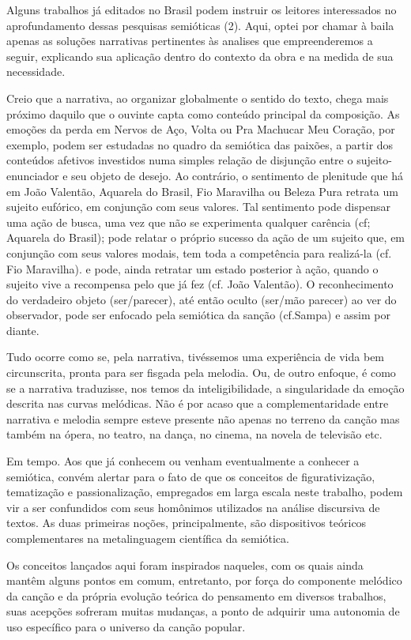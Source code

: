 Alguns trabalhos já editados no Brasil podem instruir os leitores
interessados no aprofundamento dessas pesquisas semióticas (2). Aqui,
optei por chamar à baila apenas as soluções narrativas pertinentes às
analises que empreenderemos a seguir, explicando sua aplicação dentro do
contexto da obra e na medida de sua necessidade.

Creio que a narrativa, ao organizar globalmente o sentido do texto,
chega mais próximo daquilo que o ouvinte capta como conteúdo principal
da composição. As emoções da perda em Nervos de Aço, Volta ou Pra
Machucar Meu Coração, por exemplo, podem ser estudadas no quadro da
semiótica das paixões, a partir dos conteúdos afetivos investidos numa
simples relação de disjunção entre o sujeito-enunciador e seu objeto de
desejo. Ao contrário, o sentimento de plenitude que há em João Valentão,
Aquarela do Brasil, Fio Maravilha ou Beleza Pura retrata um sujeito
eufórico, em conjunção com seus valores. Tal sentimento pode dispensar
uma ação de busca, uma vez que não se experimenta qualquer carência (cf;
Aquarela do Brasil); pode relatar o próprio sucesso da ação de um
sujeito que, em conjunção com seus valores modais, tem toda a
competência para realizá-la (cf. Fio Maravilha). e pode, ainda retratar
um estado posterior à ação, quando o sujeito vive a recompensa pelo que
já fez (cf. João Valentão). O reconhecimento do verdadeiro objeto
(ser/parecer), até então oculto (ser/mão parecer) ao ver do observador,
pode ser enfocado pela semiótica da sanção (cf.Sampa) e assim por
diante.

Tudo ocorre como se, pela narrativa, tivéssemos uma experiência de vida
bem circunscrita, pronta para ser fisgada pela melodia. Ou, de outro
enfoque, é como se a narrativa traduzisse, nos temos da
inteligibilidade, a singularidade da emoção descrita nas curvas
melódicas. Não é por acaso que a complementaridade entre narrativa e
melodia sempre esteve presente não apenas no terreno da canção mas
também na ópera, no teatro, na dança, no cinema, na novela de televisão
etc.

Em tempo. Aos que já conhecem ou venham eventualmente a conhecer a
semiótica, convém alertar para o fato de que os conceitos de
figurativização, tematização e passionalização, empregados em larga
escala neste trabalho, podem vir a ser confundidos com seus homônimos
utilizados na análise discursiva de textos. As duas primeiras noções,
principalmente, são dispositivos teóricos complementares na
metalinguagem científica da semiótica.

Os conceitos lançados aqui foram inspirados naqueles, com os quais ainda
mantêm alguns pontos em comum, entretanto, por força do componente
melódico da canção e da própria evolução teórica do pensamento em
diversos trabalhos, suas acepções sofreram muitas mudanças, a ponto de
adquirir uma autonomia de uso específico para o universo da canção
popular.

